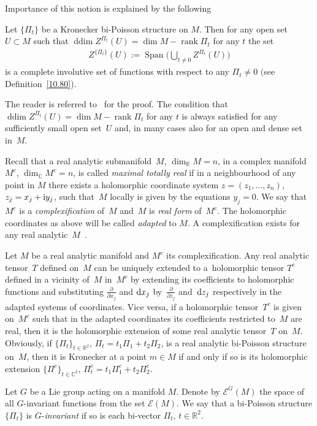 Importance of this notion is explained by the following

\begin{Theorem}\label{prop}Let $\{\Pi_t\}$ be a Kronecker bi-Poisson structure on $M$. Then for any open set $U \subset M$ such that $\operatorname{ddim} Z^{\Pi_t}(U)=\dim M-\operatorname{rank} \Pi_t$ for any $t$ the set
\begin{gather*}
Z^{\{\Pi_t\}}(U):=\operatorname{Span}\bigg(\bigcup_{t\not=0}Z^{\Pi_t}(U)\bigg)
\end{gather*}
is a complete involutive set of functions with respect to any $\Pi_t\not =0$ $($see Definition~{\rm \ref{10.80})}.
\end{Theorem}
The reader is referred to~\cite{bols'} for the proof. The condition that $\operatorname{ddim} Z^{\Pi_t}(U)=\dim M-\operatorname{rank} \Pi_t$ for any $t$ is always satisfied for any sufficiently small open set~$U$ and, in many cases also for an open and dense set in~$M$.

\begin{Remark}\label{rem}Recall that a real analytic submanifold~$M$, $\dim_\mathbb{R} M=n$, in a complex manifold~${M}^c$, $\dim_\mathbb{C}{M}^c=n$, is called \emph{maximal totally real} if in a neighbourhood of any point in $M$ there exists a holomorphic coordinate system $z=(z_1,\dots,z_n)$, $z_j=x_j+{\rm i}y_j$, such that~$M$ locally is given by the equations $y_j=0$. We say that ${M}^c$ is a \emph{complexification} of~$M$ and~$M$ is \emph{real form} of~${M}^c$. The holomorphic coordinates as above will be called \emph{adapted} to $M$. A complexification exists for any real analytic~$M$~\cite{bw}.

Let $M$ be a real analytic manifold and ${M}^c$ its complexification. Any real analytic tensor~$T$ defined on~$M$ can be uniquely extended to a~holomorphic tensor ${T}^c$ defined in a vicinity of~$M$ in~${M}^c$ by extending its coefficients to holomorphic functions and substituting $\frac{\partial }{\partial x_j}$ and ${\rm d}x_j$ by~$\frac{\partial }{\partial z_j}$ and~${\rm d}z_j$ respectively in the adapted systems of coordinates. Vice versa, if a holomorphic tensor~${T}^c$ is given on~${M}^c$ such that in the adapted coordinates its coefficients restricted to~$M$ are real, then it is the holomorphic extension of some real analytic tensor~$T$ on~$M$. Obviously, if $\{\Pi_t\}_{t\in\mathbb{R}^2}$, $\Pi_t=t_1\Pi_1+t_2\Pi_2$, is a real analytic bi-Poisson structure on~$M$, then it is Kronecker at a point $m\in M$ if and only if so is its holomorphic extension $\{{\Pi}^c\}_{t\in\mathbb{C}^2}$, ${\Pi}^c_t=t_1{\Pi}^c_1+t_2 {\Pi}^c_2$.

\end{Remark}Let $G$ be a Lie group acting on a manifold $M$. Denote by $\mathcal{E}^G(M)$ the space of all $G$-invariant functions from the set ${\mathcal E}(M)$. We say that a bi-Poisson structure $\{\Pi_t\}$ is $G$-\emph{invariant} if so is each bi-vector $\Pi_t$, $t\in\mathbb{R}^2$.

